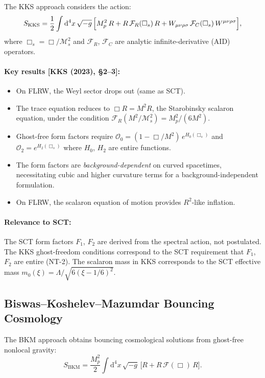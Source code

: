 \documentclass[12pt,a4paper]{article}
\theoremstyle{definition}
\theoremstyle{remark}
\newcommand{\dd}{\mathrm{d}}
\newcommand{\fromlit}[1]{\textcolor{blue!70!black}{\textsf{[#1]}}}
\begin{document}
The KKS approach \cite{KKS23} considers the action:
\begin{equation}\label{eq:KKS-action}
  S_{\mathrm{KKS}} = \frac{1}{2}\int\dd^4 x\,\sqrt{-g}\,
  \Bigl[M_p^2\,R + R\,\mathcal{F}_R(\Box_s)\,R
  + W_{\mu\nu\rho\sigma}\,\mathcal{F}_C(\Box_s)\,
  W^{\mu\nu\rho\sigma}\Bigr],
\end{equation}
where $\Box_s = \Box/\mathcal{M}_s^2$ and $\mathcal{F}_R$,
$\mathcal{F}_C$ are analytic infinite-derivative (AID) operators.

\paragraph{Key results \fromlit{KKS (2023), \S2--3}:}
\begin{itemize}[nosep]
  \item On FLRW, the Weyl sector drops out (same as SCT).
  \item The trace equation reduces to $\Box R = M^2 R$, the
    Starobinsky scalaron equation, under the condition
    $\mathcal{F}_R(M^2/\mathcal{M}_s^2) = M_p^2/(6M^2)$.
  \item Ghost-free form factors require
    $\mathcal{O}_0 = (1 - \Box/M^2)\,e^{H_0(\Box_s)}$ and
    $\mathcal{O}_2 = e^{H_2(\Box_s)}$ where $H_0$, $H_2$ are
    entire functions.
  \item The form factors are \emph{background-dependent} on curved
    spacetimes, necessitating cubic and higher curvature terms
    for a background-independent formulation.
  \item On FLRW, the scalaron equation of motion provides
    $R^2$-like inflation.
\end{itemize}

\paragraph{Relevance to SCT:} The SCT form factors $F_1$, $F_2$
are derived from the spectral action, not postulated. The KKS
ghost-freedom conditions correspond to the SCT requirement that
$F_1$, $F_2$ are entire (NT-2). The scalaron mass in KKS corresponds
to the SCT effective mass $m_0(\xi) = \Lambda/\sqrt{6(\xi - 1/6)^2}$.

\subsection{Biswas--Koshelev--Mazumdar Bouncing Cosmology}
\label{sec:BKM}

The BKM approach \cite{BMS06,BKM10} obtains bouncing cosmological
solutions from ghost-free nonlocal gravity:
\begin{equation}\label{eq:BKM-action}
  S_{\mathrm{BKM}} = \frac{M_p^2}{2}\int\dd^4 x\,\sqrt{-g}\,
  \bigl[R + R\,\mathcal{F}(\Box)\,R\bigr].
\end{equation}
\end{document}
